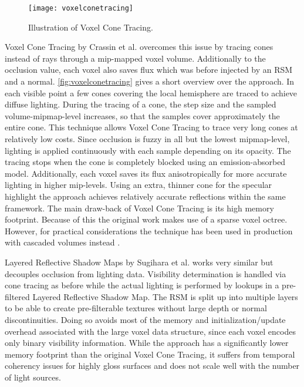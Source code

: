 \documentclass[thesis.tex]{subfiles}
\begin{document}
\begin{figure}[h]
\centering
\texttt{[image: voxelconetracing]}
\caption{\cite{bib:voxelconetracing} Illustration of Voxel Cone Tracing. } \label{fig:voxelconetracing}
\end{figure}
Voxel Cone Tracing by Crassin et al. \cite{bib:voxelconetracing} overcomes this issue by tracing cones instead of rays through a mip-mapped voxel volume.
Additionally to the occlusion value, each voxel also saves flux which was before injected by an RSM and a normal.
\autoref{fig:voxelconetracing} gives a short overview over the approach.
In each visible point a few cones covering the local hemisphere are traced to achieve diffuse lighting.
During the tracing of a cone, the step size and the sampled volume-mipmap-level increases, so that the samples cover approximately the entire cone.
This technique allows Voxel Cone Tracing to trace very long cones at relatively low costs.
Since occlusion is fuzzy in all but the lowest mipmap-level, lighting is applied continuously with each sample depending on its opacity.
The tracing stops when the cone is completely blocked using an emission-absorbed model.
Additionally, each voxel saves its flux anisotropically for more accurate lighting in higher mip-levels.
Using an extra, thinner cone for the specular highlight the approach achieves relatively accurate reflections within the same framework.
The main draw-back of Voxel Cone Tracing is its high memory footprint.
Because of this the original work makes use of a sparse voxel octree.
However, for practical considerations the technique has been used in production with cascaded volumes instead \cite{bib:fumufu:vct}.

Layered Reflective Shadow Maps by Sugihara et al. \cite{bib:layeredrsm} works very similar but decouples occlusion from lighting data.
Visibility determination is handled via cone tracing as before while the actual lighting is performed by lookups in a pre-filtered Layered Reflective Shadow Map.
The RSM is split up into multiple layers to be able to create pre-filterable textures without large depth or normal discontinuities.
Doing so avoids most of the memory and initialization/update overhead associated with the large voxel data structure, since each voxel encodes only binary visibility information.
While the approach has a significantly lower memory footprint than the original Voxel Cone Tracing, it suffers from temporal coherency issues for highly gloss surfaces and does not scale well with the number of light sources.
\end{document}
